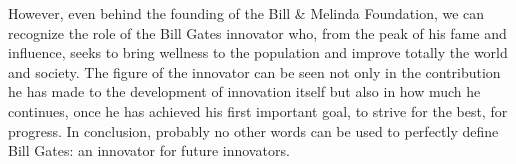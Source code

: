However, even behind the founding of the Bill \& Melinda Foundation, we can recognize the role of the Bill Gates innovator who, from the peak of his fame and influence, seeks to bring wellness to the population and improve totally the world and society. The figure of the innovator can be seen not only in the contribution he has made to the development of innovation itself but also in how much he continues, once he has achieved his first important goal, to strive for the best, for progress. In conclusion, probably no other words can be used to perfectly define Bill Gates: an innovator for future innovators.
